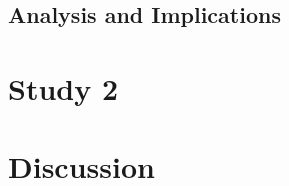 \subsection{Analysis and Implications}







\section{Study 2\label{Hardware:Study 2}}













\section{Discussion\label{Hardware:Discussion}}









